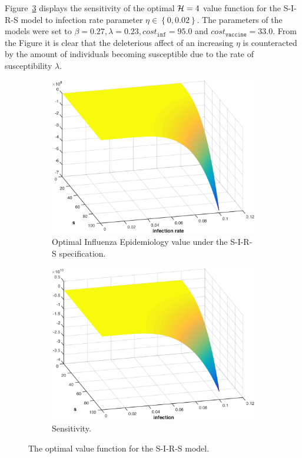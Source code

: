 Figure~\ref{fig:influenza_sirs} displays the sensitivity of the optimal {\footnotesize$ \mathcal{H} = 4 $} value function for the S-I-R-S model to infection rate parameter {\footnotesize $ \eta \in \left\lbrace 0, 0.02 \right\rbrace$}. The parameters of the models were set to {\footnotesize$ \beta = 0.27, \lambda = 0.23, cost_{\mathtt{inf}} = 95.0$} and {\footnotesize$cost_{\mathtt{vaccine}} = 33.0$}. From the Figure it is clear that the deleterious affect of an increasing {\footnotesize $ \eta $} is counteracted by the amount of individuals becoming susceptible due to the rate of susceptibility {\footnotesize $ \lambda $}.
\begin{figure}[t!]
    \centering
    \begin{subfigure}[b]{0.4\textwidth}    
        \includegraphics[width=0.8\linewidth, height=0.6\linewidth]{images/sir_infection_s}
        \caption{Optimal Influenza Epidemiology value under the S-I-R-S specification.}
        \label{fig:influenza_sirs_value_function}
        \vspace{1em}
    \end{subfigure}
    
    \begin{subfigure}[b]{0.4\textwidth}    
        \includegraphics[width=0.8\linewidth, height=0.6\linewidth]{images/sir_infection_sensitivity}
        \caption{Sensitivity.}
        \label{fig:influenza_sirs_sensitivity}
    \end{subfigure}  
    \caption{The optimal value function for the S-I-R-S model.}
    \label{fig:influenza_sirs}      
\end{figure}
